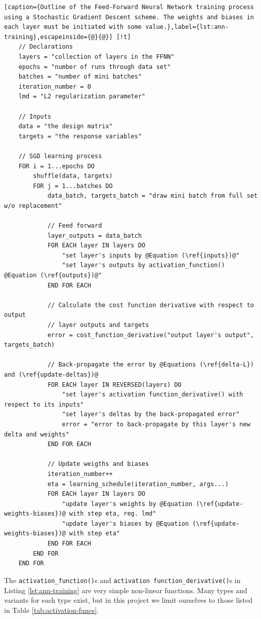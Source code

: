 \documentclass[]{article}
\begin{document}
\begin{lstlisting}[caption={Outline of the Feed-Forward Neural Network training process using a Stochastic Gradient Descent scheme. The weights and biases in each layer must be initiated with some value.},label={lst:ann-training},escapeinside={@}{@}] [!t]
	// Declarations
	layers = "collection of layers in the FFNN"
	epochs = "number of runs through data set"
	batches = "number of mini batches"
	iteration_number = 0
	lmd = "L2 regularization parameter"
	
	// Inputs
	data = "the design matrix"
	targets = "the response variables"
	
	// SGD learning process
	FOR i = 1...epochs DO
		shuffle(data, targets)
		FOR j = 1...batches DO
			data_batch, targets_batch = "draw mini batch from full set w/o replacement"
			
			// Feed forward
			layer_outputs = data_batch			
			FOR EACH layer IN layers DO
				"set layer's inputs by @Equation (\ref{inputs})@"
				"set layer's outputs by activation_function() @Equation (\ref{outputs})@"
			END FOR EACH
			
			// Calculate the cost function derivative with respect to output
			// layer outputs and targets
			error = cost_function_derivative("output layer's output", targets_batch)
			
			// Back-propagate the error by @Equations (\ref{delta-L}) and (\ref{update-deltas})@
			FOR EACH layer IN REVERSED(layers) DO
				"set layer's activation function_derivative() with respect to its inputs"
				"set layer's deltas by the back-propagated error"
				error = "error to back-propagate by this layer's new delta and weights"
			END FOR EACH		
			
			// Update weigths and biases
			iteration_number++
			eta = learning_schedule(iteration_number, args...)
			FOR EACH layer IN layers DO
				"update layer's weights by @Equation (\ref{update-weights-biases})@ with step eta, reg. lmd"
				"update layer's biases by @Equation (\ref{update-weights-biases})@ with step eta"
			END FOR EACH
		END FOR
	END FOR
\end{lstlisting}


\vspace{5mm}

The \lstinline|activation_function()|s and \lstinline|activation function_derivative()|s in Listing \ref{lst:ann-training} are very simple non-linear functions. Many types and variants for each type exist, but in this project we limit ourselves to those listed in Table \ref{tab:activation-funcs}.
\end{document}
